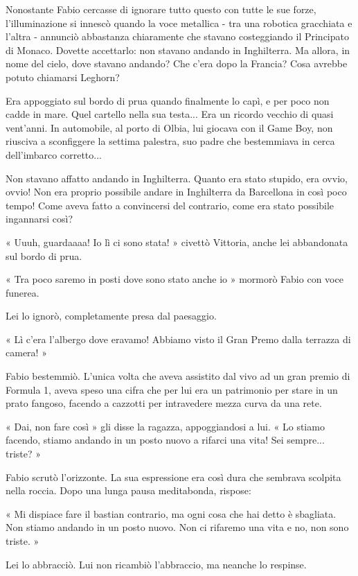 Nonostante Fabio cercasse di ignorare tutto questo con tutte le sue forze, l'illuminazione si innescò quando la voce metallica - tra una robotica gracchiata e l'altra - annunciò abbastanza chiaramente che stavano costeggiando il Principato di Monaco. Dovette accettarlo: non stavano andando in Inghilterra. Ma allora, in nome del cielo, dove stavano andando? Che c'era dopo la Francia? Cosa avrebbe potuto chiamarsi Leghorn?

Era appoggiato sul bordo di prua quando finalmente lo capì, e per poco non cadde in mare. Quel cartello nella sua testa... Era un ricordo vecchio di quasi vent'anni. In automobile, al porto di Olbia, lui giocava con il Game Boy, non riusciva a sconfiggere la settima palestra, suo padre che bestemmiava in cerca dell'imbarco corretto...

Non stavano affatto andando in Inghilterra. Quanto era stato stupido, era ovvio, ovvio! Non era proprio possibile andare in Inghilterra da Barcellona in così poco tempo! Come aveva fatto a convincersi del contrario, come era stato possibile ingannarsi così?

« Uuuh, guardaaaa! Io lì ci sono stata! » civettò Vittoria, anche lei abbandonata sul bordo di prua.

« Tra poco saremo in posti dove sono stato anche io » mormorò Fabio con voce funerea.

Lei lo ignorò, completamente presa dal paesaggio.

« Lì c'era l'albergo dove eravamo! Abbiamo visto il Gran Premo dalla terrazza di camera! »

Fabio bestemmiò. L'unica volta che aveva assistito dal vivo ad un gran premio di Formula 1, aveva speso una cifra che per lui era un patrimonio per stare in un prato fangoso, facendo a cazzotti per intravedere mezza curva da una rete.

« Dai, non fare così » gli disse la ragazza, appoggiandosi a lui. « Lo stiamo facendo, stiamo andando in un posto nuovo a rifarci una vita! Sei sempre... triste? »

Fabio scrutò l'orizzonte. La sua espressione era così dura che sembrava scolpita nella roccia. Dopo una lunga pausa meditabonda, rispose:

« Mi dispiace fare il bastian contrario, ma ogni cosa che hai detto è sbagliata. Non stiamo andando in un posto nuovo. Non ci rifaremo una vita e no, non sono triste. »

Lei lo abbracciò. Lui non ricambiò l'abbraccio, ma neanche lo respinse.

